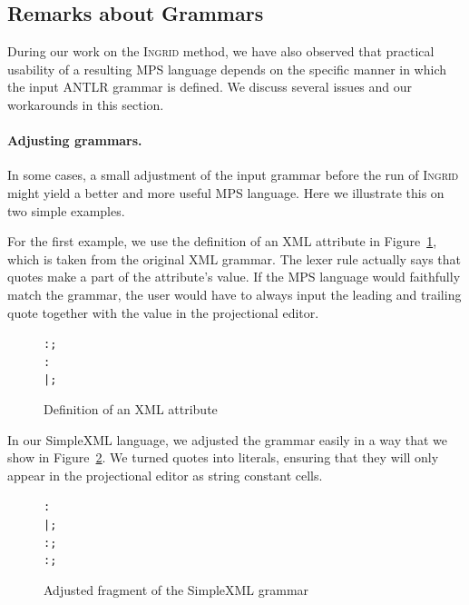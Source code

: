 \subsection{Remarks about Grammars}
\label{sect:REMARKSGRAMMARS}

During our work on the \textsc{Ingrid} method, we have also observed that practical usability of a resulting MPS language depends on the specific manner in which the input ANTLR grammar is defined.
We discuss several issues and our workarounds in this section.

\paragraph{Adjusting grammars.}
In some cases, a small adjustment of the input grammar before the run of \textsc{Ingrid} might yield a better and more useful MPS language.
Here we illustrate this on two simple examples.

For the first example, we use the definition of an XML attribute in Figure~\ref{fig:XMLATTRIB}, which is taken from the original XML grammar.
The lexer rule  actually says that quotes make a part of the attribute's value.
If the MPS language would faithfully match the grammar, the user would have to always input the leading and trailing quote together with the value in the projectional editor.

\begin{figure}[ht]
\begin{framed}
\begin{alltt}
\small
   :  \antlrliteral{=}  ;
   :  \antlrregex{~["]*} 
         |  \antlrregex{~[']*}  ;
\end{alltt}
\end{framed}
\caption{Definition of an XML attribute}
\label{fig:XMLATTRIB}
\end{figure}

In our SimpleXML language, we adjusted the grammar easily in a way that we show in Figure~\ref{fig:XMLADJUST}.
We turned quotes into literals, ensuring that they will only appear in the projectional editor as string constant cells.

\begin{figure}[ht]
\begin{framed}
\begin{alltt}
\small
   :    
         |     ;
   : \antlrregex{~["]*} ;
   : \antlrregex{~[']*} ;
\end{alltt}
\end{framed}
\caption{Adjusted fragment of the SimpleXML grammar}
\label{fig:XMLADJUST}
\end{figure}

